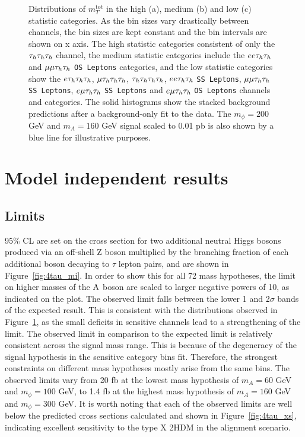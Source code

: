 \begin{figure}[!hbtp]
\caption{Distributions of $m_{T}^\text{tot}$ in the high (a), medium (b) and low (c) statistic categories. As the bin sizes vary drastically between channels, the bin sizes are kept constant and the bin intervals are shown on x axis. The high statistic categories consistent of only the $\tau_{h}\tau_{h}\tau_{h}$ channel, the medium statistic categories include the $ee\tau_{h}\tau_{h}$ and $\mu\mu\tau_{h}\tau_{h}$ \texttt{OS Leptons} categories, and the low statistic categories show the $e\tau_{h}\tau_{h}\tau_{h}$, $\mu\tau_{h}\tau_{h}\tau_{h}$, $\tau_{h}\tau_{h}\tau_{h}\tau_{h}$,  $ee\tau_{h}\tau_{h}$ \texttt{SS Leptons}, $\mu\mu\tau_{h}\tau_{h}$ \texttt{SS Leptons}, $e\mu\tau_{h}\tau_{h}$ \texttt{SS Leptons} and $e\mu\tau_{h}\tau_{h}$ \texttt{OS Leptons} channels and categories. The solid histograms show the stacked background predictions after a background-only fit to the data. The $m_{\phi}=200$ GeV and $m_{A}=160$ GeV signal scaled to 0.01 pb is also shown by a blue line for illustrative purposes.}
\label{fig:4tau_postfit}
\end{figure}


\section{Model independent results}

\subsection{Limits}

95\% \ac{CL} are set on the cross section for two additional neutral Higgs bosons produced via an off-shell Z boson multiplied by the branching fraction of each additional boson decaying to $\tau$ lepton pairs, and are shown in Figure~\ref{fig:4tau_mi}.
In order to show this for all 72 mass hypotheses, the limit on higher masses of the ${\text{A}}$ boson are scaled to larger negative powers of 10, as indicated on the plot.
The observed limit falls between the lower 1 and 2$\sigma$ bands of the expected result.
This is consistent with the distributions observed in Figure~\ref{fig:4tau_postfit}, as the small deficits in sensitive channels lead to a strengthening of the limit.
The observed limit in comparison to the expected limit is relatively consistent across the signal mass range.
This is because of the degeneracy of the signal hypothesis in the sensitive category bins fit.
Therefore, the strongest constraints on different mass hypotheses mostly arise from the same bins.
The observed limits vary from 20 fb at the lowest mass hypothesis of $m_A = 60$ GeV and $m_{\phi} = 100$ GeV, to 1.4 fb at the highest mass hypothesis of $m_A = 160$ GeV and $m_{\phi} = 300$ GeV.
It is worth noting that each of the observed limits are well below the predicted cross sections calculated and shown in Figure~\ref{fig:4tau_xs}, indicating excellent sensitivity to the type X \ac{2HDM} in the alignment scenario. \\

